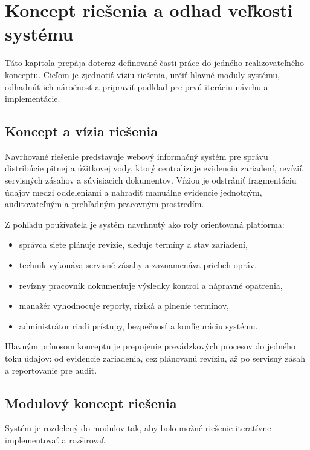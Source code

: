 
\chapter{Koncept riešenia a odhad veľkosti systému}\label{ch:concept-and-size}

Táto kapitola prepája doteraz definované časti práce do jedného realizovateľného konceptu. Cieľom je zjednotiť víziu riešenia, určiť hlavné moduly systému, odhadnúť ich náročnosť a pripraviť podklad pre prvú iteráciu návrhu a implementácie.

\section{Koncept a vízia riešenia}

Navrhované riešenie predstavuje webový informačný systém pre správu distribúcie pitnej a úžitkovej vody, ktorý centralizuje evidenciu zariadení, revízií, servisných zásahov a súvisiacich dokumentov. Víziou je odstrániť fragmentáciu údajov medzi oddeleniami a nahradiť manuálne evidencie jednotným, auditovateľným a prehľadným pracovným prostredím.

Z pohľadu používateľa je systém navrhnutý ako roly orientovaná platforma:

\begin{itemize}
\item správca siete plánuje revízie, sleduje termíny a stav zariadení,
\item technik vykonáva servisné zásahy a zaznamenáva priebeh opráv,
\item revízny pracovník dokumentuje výsledky kontrol a nápravné opatrenia,
\item manažér vyhodnocuje reporty, riziká a plnenie termínov,
\item administrátor riadi prístupy, bezpečnosť a konfiguráciu systému.
\end{itemize}

Hlavným prínosom konceptu je prepojenie prevádzkových procesov do jedného toku údajov: od evidencie zariadenia, cez plánovanú revíziu, až po servisný zásah a reportovanie pre audit.

\section{Modulový koncept riešenia}

Systém je rozdelený do modulov tak, aby bolo možné riešenie iteratívne implementovať a rozširovať:


